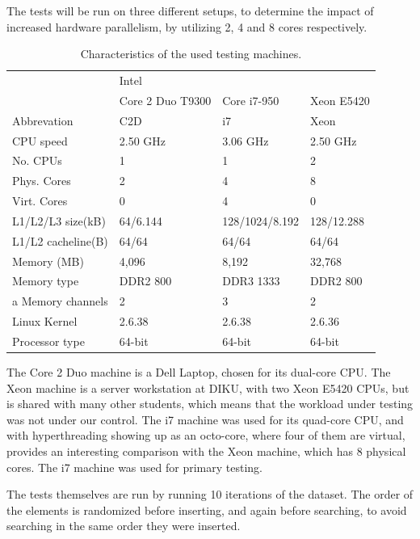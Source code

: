 The tests will be run on three different setups, to determine the impact of
increased hardware parallelism, by utilizing 2, 4 and 8 cores respectively.

\begin{table}[h!]
    \centering
    \begin{tabular}[here]{ l l l l }
        \hline
                  & Intel \\\cline{2-4}
                  & Core 2 Duo T9300 & Core i7-950  & Xeon E5420 \\ \hline
        Abbrevation & C2D & i7 & Xeon \\ 
        CPU speed   & 2.50 GHz & 3.06 GHz & 2.50 GHz \\
        No. CPUs    & 1 & 1 & 2 \\
        Phys. Cores & 2 & 4 & 8 \\
        Virt. Cores & 0 & 4 & 0 \\
        L1/L2/L3 size(kB) & 64/6.144 & 128/1024/8.192 & 128/12.288\\
        L1/L2 cacheline(B) & 64/64 & 64/64 & 64/64\\
        Memory (MB) & 4,096 & 8,192 & 32,768 \\
        Memory type & DDR2 800 & DDR3 1333 & DDR2 800 \\a
        Memory channels & 2 & 3 & 2 \\
        Linux Kernel    & 2.6.38 & 2.6.38 & 2.6.36 \\
        Processor type  & 64-bit & 64-bit & 64-bit \\\hline
    \end{tabular}
    \caption{Characteristics of the used testing machines.}
    \label{tab:cpucpecs}
\end{table}

The Core 2 Duo machine is a Dell Laptop, chosen for its dual-core CPU.
The Xeon machine is a server workstation at DIKU, with two Xeon E5420 CPUs,
but is shared with many other students, which means that the workload
under testing was not under our control. The i7 machine was used for its
quad-core CPU, and with hyperthreading showing up as an octo-core, where four
of them are virtual, provides an interesting comparison with the Xeon machine,
which has 8 physical cores. The i7 machine was used for primary testing.

The tests themselves are run by running 10 iterations of the dataset. The order
of the elements is randomized before inserting, and again before searching, to
avoid searching in the same order they were inserted.

